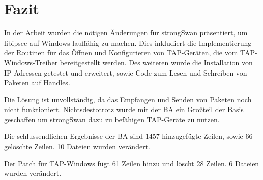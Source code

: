 



\section{Fazit}

In der Arbeit wurden die nötigen Änderungen für strongSwan präsentiert, um
libipsec auf Windows lauffähig zu machen. Dies inkludiert die Implementierung
der Routinen für das Öffnen und Konfigurieren von TAP-Geräten, die vom TAP-Windows-Treiber
bereitgestellt werden. Des weiteren wurde die Installation von IP-Adressen getestet
und erweitert, sowie Code zum Lesen und Schreiben von Paketen auf Handles.

Die Lösung ist unvollständig, da das Empfangen und Senden von Paketen noch nicht funktioniert.
Nichtsdestotrotz wurde mit der \ac{BA} ein Großteil der Basis geschaffen um strongSwan
dazu zu befähigen TAP-Geräte zu nutzen.

Die schlussendlichen Ergebnisse der \ac{BA} sind 1457 hinzugefügte Zeilen,
sowie 66 gelöschte Zeilen. 10 Dateien wurden verändert.

Der Patch für TAP-Windows fügt 61 Zeilen hinzu und löscht 28 Zeilen. 6 Dateien
wurden verändert.


